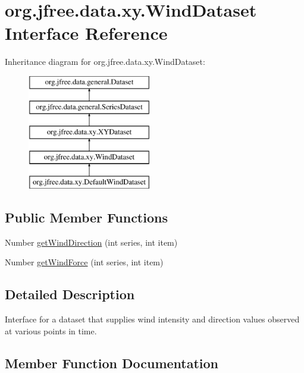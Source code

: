 \hypertarget{interfaceorg_1_1jfree_1_1data_1_1xy_1_1_wind_dataset}{}\section{org.\+jfree.\+data.\+xy.\+Wind\+Dataset Interface Reference}
\label{interfaceorg_1_1jfree_1_1data_1_1xy_1_1_wind_dataset}
Inheritance diagram for org.\+jfree.\+data.\+xy.\+Wind\+Dataset\+:\begin{figure}[H]
\begin{center}
\leavevmode
\includegraphics[height=5.000000cm]{interfaceorg_1_1jfree_1_1data_1_1xy_1_1_wind_dataset}
\end{center}
\end{figure}
\subsection*{Public Member Functions}
\begin{DoxyCompactItemize}
\item 
Number \mbox{\hyperlink{interfaceorg_1_1jfree_1_1data_1_1xy_1_1_wind_dataset_a09dd402242d69a323703cedf2574a876}{get\+Wind\+Direction}} (int series, int item)
\item 
Number \mbox{\hyperlink{interfaceorg_1_1jfree_1_1data_1_1xy_1_1_wind_dataset_aae53f6715a54e1f6b34e2b7d19564463}{get\+Wind\+Force}} (int series, int item)
\end{DoxyCompactItemize}


\subsection{Detailed Description}
Interface for a dataset that supplies wind intensity and direction values observed at various points in time. 

\subsection{Member Function Documentation}
\mbox{\label{interfaceorg_1_1jfree_1_1data_1_1xy_1_1_wind_dataset_a09dd402242d69a323703cedf2574a876}} 

